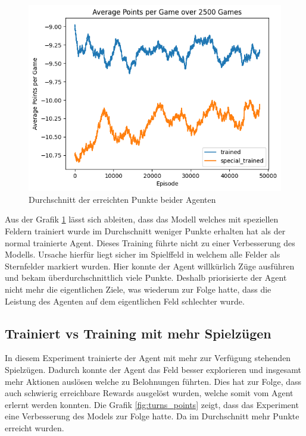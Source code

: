 \begin{figure}[!h]
    \centering
    \includegraphics[scale=0.6]{Bilder/points_special_trained.png}
    \caption{Durchschnitt der erreichten Punkte beider Agenten}
    \label{fig:special_points}
\end{figure}


Aus der Grafik \ref{fig:special_points} lässt sich ableiten, dass das Modell welches mit speziellen Feldern trainiert wurde im Durchschnitt weniger Punkte erhalten hat als der normal trainierte Agent.
Dieses Training führte nicht zu einer Verbesserung des Modells. Ursache hierfür liegt sicher im Spielffeld in welchem alle Felder als Sternfelder markiert wurden. Hier konnte der Agent willkürlich Züge ausführen und bekam überdurchschnittlich viele Punkte. Deshalb priorisierte der Agent nicht mehr die eigentlichen Ziele, was wiederum zur Folge hatte, dass die Leistung des Agenten auf dem eigentlichen Feld schlechter wurde. 

\subsection{Trainiert vs Training mit mehr Spielzügen}

In diesem Experiment trainierte der Agent mit mehr zur Verfügung stehenden Spielzügen. Dadurch konnte der Agent das Feld besser explorieren und insgesamt mehr Aktionen auslösen welche zu Belohnungen führten. Dies hat zur Folge, dass auch schwierig erreichbare Rewards ausgelöst wurden, welche somit vom Agent erlernt werden konnten. 
Die Grafik \ref{fig:turns_points} zeigt, dass das Experiment eine Verbesserung des Models zur Folge hatte. Da im Durchschnitt mehr Punkte erreicht wurden.

